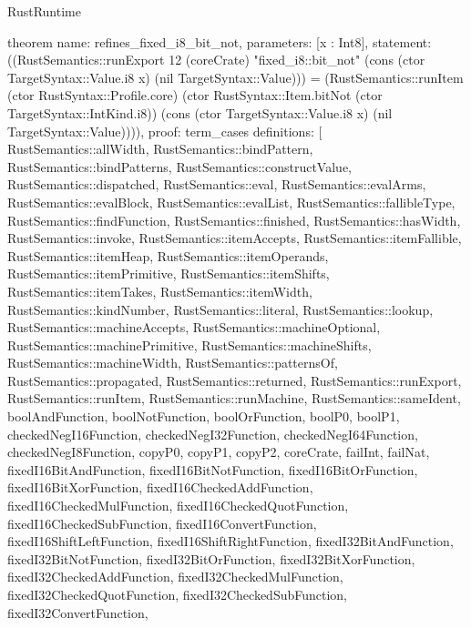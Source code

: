 \begin{lexlean}{RustRuntime}
\begin{semanticmodule}
theorem{
  name: refines_fixed_i8_bit_not,
  parameters: [x : Int8],
  statement: ((RustSemantics::runExport 12 (coreCrate) "fixed_i8::bit_not" (cons (ctor TargetSyntax::Value.i8 x) (nil TargetSyntax::Value))) = (RustSemantics::runItem (ctor RustSyntax::Profile.core) (ctor RustSyntax::Item.bitNot (ctor TargetSyntax::IntKind.i8)) (cons (ctor TargetSyntax::Value.i8 x) (nil TargetSyntax::Value)))),
  proof: term_cases{
    definitions: [
      RustSemantics::allWidth,
      RustSemantics::bindPattern,
      RustSemantics::bindPatterns,
      RustSemantics::constructValue,
      RustSemantics::dispatched,
      RustSemantics::eval,
      RustSemantics::evalArms,
      RustSemantics::evalBlock,
      RustSemantics::evalList,
      RustSemantics::fallibleType,
      RustSemantics::findFunction,
      RustSemantics::finished,
      RustSemantics::hasWidth,
      RustSemantics::invoke,
      RustSemantics::itemAccepts,
      RustSemantics::itemFallible,
      RustSemantics::itemHeap,
      RustSemantics::itemOperands,
      RustSemantics::itemPrimitive,
      RustSemantics::itemShifts,
      RustSemantics::itemTakes,
      RustSemantics::itemWidth,
      RustSemantics::kindNumber,
      RustSemantics::literal,
      RustSemantics::lookup,
      RustSemantics::machineAccepts,
      RustSemantics::machineOptional,
      RustSemantics::machinePrimitive,
      RustSemantics::machineShifts,
      RustSemantics::machineWidth,
      RustSemantics::patternsOf,
      RustSemantics::propagated,
      RustSemantics::returned,
      RustSemantics::runExport,
      RustSemantics::runItem,
      RustSemantics::runMachine,
      RustSemantics::sameIdent,
      boolAndFunction,
      boolNotFunction,
      boolOrFunction,
      boolP0,
      boolP1,
      checkedNegI16Function,
      checkedNegI32Function,
      checkedNegI64Function,
      checkedNegI8Function,
      copyP0,
      copyP1,
      copyP2,
      coreCrate,
      failInt,
      failNat,
      fixedI16BitAndFunction,
      fixedI16BitNotFunction,
      fixedI16BitOrFunction,
      fixedI16BitXorFunction,
      fixedI16CheckedAddFunction,
      fixedI16CheckedMulFunction,
      fixedI16CheckedQuotFunction,
      fixedI16CheckedSubFunction,
      fixedI16ConvertFunction,
      fixedI16ShiftLeftFunction,
      fixedI16ShiftRightFunction,
      fixedI32BitAndFunction,
      fixedI32BitNotFunction,
      fixedI32BitOrFunction,
      fixedI32BitXorFunction,
      fixedI32CheckedAddFunction,
      fixedI32CheckedMulFunction,
      fixedI32CheckedQuotFunction,
      fixedI32CheckedSubFunction,
      fixedI32ConvertFunction,
}}
\end{semanticmodule}
\end{lexlean}
